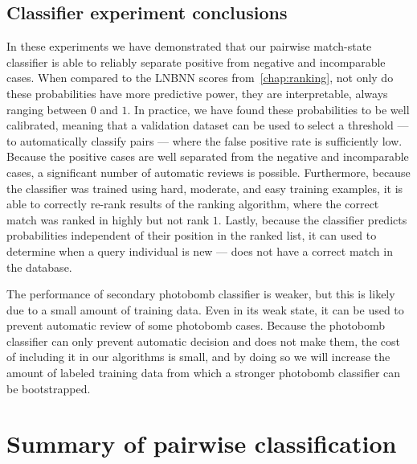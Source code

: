         \ConfusionPhotobomb{}

        \EvalMetricsPhotobomb{}

        \ImportantPBFeat{}

    \FloatBarrier{}
    \subsection{Classifier experiment conclusions}
        In these experiments we have demonstrated that our pairwise match-state classifier is able to reliably
          separate positive from negative and incomparable cases.
        When compared to the LNBNN scores from~\cref{chap:ranking}, not only do these probabilities have more
          predictive power, they are interpretable, always ranging between $0$ and $1$.
        In practice, we have found these probabilities to be well calibrated, meaning that a validation dataset
          can be used to select a threshold --- to automatically classify pairs --- where the false positive rate
          is sufficiently low.
        Because the positive cases are well separated from the negative and incomparable cases, a significant
          number of automatic reviews is possible.
        Furthermore, because the classifier was trained using hard, moderate, and easy training examples, it is
          able to correctly re-rank results of the ranking algorithm, where the correct match was ranked in highly
          but not rank $1$.
        Lastly, because the classifier predicts probabilities independent of their position in the ranked list,
          it can used to determine when a query individual is new --- \ie{} does not have a correct match in the
          database.

        The performance of secondary photobomb classifier is weaker, but this is likely due to a small amount of
          training data.
        Even in its weak state, it can be used to prevent automatic review of some photobomb cases.
        Because the photobomb classifier can only prevent automatic decision and does not make them, the cost of
          including it in our algorithms is small, and by doing so we will increase the amount of labeled training
          data from which a stronger photobomb classifier can be bootstrapped.


\section{Summary of pairwise classification}\label{sec:pairconclusion}

